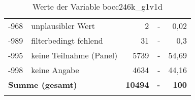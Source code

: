 \begin{longtable}{Xlrrr}
       -968 & unplausibler Wert & 2 & - & 0,02 \\

       -989 & filterbedingt fehlend & 31 & - & 0,3 \\

       -995 & keine Teilnahme (Panel) & 5739 & - & 54,69 \\

       -998 & keine Angabe & 4634 & - & 44,16 \\

     \midrule
     \multicolumn{2}{l}{\textbf{Summe (gesamt)}} & \textbf{10494} & \textbf{-} & \textbf{100} \\
     \bottomrule
     \caption{Werte der Variable bocc246k\_g1v1d}
     \end{longtable}
     
